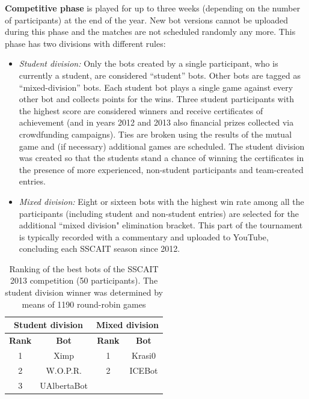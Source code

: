 \documentclass{llncs}
\begin{document}
\textbf{{Competitive phase}} is played for up to three weeks (depending on the number of participants) at the end of the year. New bot versions cannot be uploaded during this phase and the matches are not scheduled randomly any more. This phase has two divisions with different rules:
	\begin{itemize}
      \item {\em Student division:} Only the bots created by a single participant, who is currently a student, are considered ``student'' bots. Other bots are tagged as ``mixed-division'' bots. Each student bot plays a single game against every other bot and collects points for the wins. Three student participants with the highest score are considered winners and receive  certificates of achievement (and in years 2012 and 2013 also financial prizes collected via crowdfunding campaigns). Ties are broken using the results of the mutual game and (if necessary) additional games are scheduled. The student division was created so that the students stand a chance of winning the certificates in the presence of more experienced, non-student participants and team-created entries.
      \item {\em Mixed division:} Eight or sixteen bots with the highest win rate among all the participants (including student and non-student entries) are selected for the additional ``mixed division" elimination bracket. This part of the tournament is typically recorded with a commentary and uploaded to YouTube, concluding each SSCAIT season since 2012. 
    \end{itemize}


\begin{table}[!t]
\caption{Ranking of the best bots of the SSCAIT 2013 competition (50 participants).
The student division winner was determined by means of 1190 round-robin games}
\label{tab:sscait2013}
\centering
\begin{tabular}{|c|c|c|c|}
\hline
\multicolumn{2}{|c|}{Student division} & \multicolumn{2}{|c|}{Mixed division}\\ \hline
{\bfseries Rank} & {\bfseries Bot} & {\bfseries Rank} & {\bfseries Bot} \\
\hline
1 & Ximp & 1 & Krasi0 \\
2 & W.O.P.R.  & 2 & ICEBot \\
3 & UAlbertaBot 			&   &  \\
\hline
\end{tabular}
\end{table}
\end{document}
